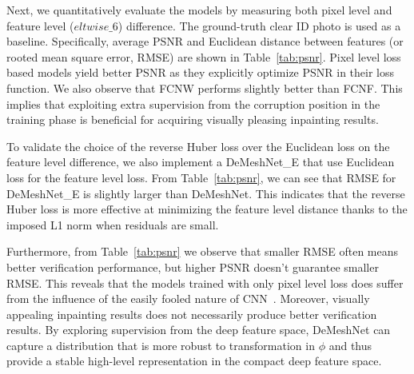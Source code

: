 \documentclass[10pt,twocolumn,letterpaper]{article}
\begin{document}



Next, we quantitatively evaluate the models by measuring both pixel level and feature level ($eltwise\_6$) difference. The ground-truth clear ID photo is used as a baseline. Specifically, average PSNR and Euclidean distance between features (or rooted mean square error, RMSE) are shown in Table~\ref{tab:psnr}. Pixel level loss based models yield better PSNR as they explicitly optimize PSNR in their loss function. We also observe that FCNW performs slightly better than FCNF. This implies that exploiting extra supervision from the corruption position in the training phase is beneficial for acquiring visually pleasing inpainting results.

To validate the choice of the reverse Huber loss over the Euclidean loss on the feature level difference, we also implement a DeMeshNet\_E that use Euclidean loss for the feature level loss. From Table~\ref{tab:psnr}, we can see that RMSE for DeMeshNet\_E is slightly larger than DeMeshNet. This indicates that the reverse Huber loss is more effective at minimizing the feature level distance thanks to the imposed L1 norm when residuals are small.

Furthermore, from Table~\ref{tab:psnr} we observe that smaller RMSE often means better verification performance, but higher PSNR doesn't guarantee smaller RMSE. This reveals that the models trained with only pixel level loss does suffer from the influence of the easily fooled nature of CNN~\cite{goodfellow2014explaining,nguyen2015deep,szegedy2013intriguing}. Moreover, visually appealing inpainting results does not necessarily produce better verification results. By exploring supervision from the deep feature space, DeMeshNet can capture a distribution that is more robust to transformation in $\phi$ and thus provide a stable high-level representation in the compact deep feature space.
\end{document}
